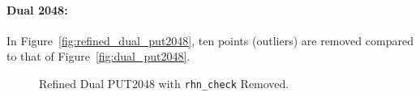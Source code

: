 \documentclass[10pt]{article}
\begin{document}
\clearpage
\newpage

\paragraph{Dual 2048:} In Figure~\ref{fig:refined_dual_put2048}, ten points (outliers) are removed compared to that of Figure~\ref{fig:dual_put2048}.
\begin{figure}[h]
	\centering
	\caption{Refined Dual PUT2048 with {\tt rhn\_check} Removed.\label{fig:new_put2048}}
\end{figure}
\end{document}
